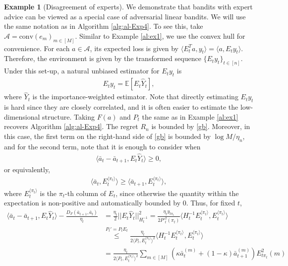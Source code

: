 \documentclass[letterpaper,11pt,openright,openany]{book}
\numberwithin{equation}{section}
\theoremstyle{plain}
\theoremstyle{definition}
\newtheorem{Ex}[Th]{Example}
\def\E{{\mathbb E}}
\begin{document}
\begin{Ex}[Disagreement of experts]\label{expert}
We demonstrate that bandits with expert advice can be viewed as a special case of adversarial linear bandits. We will use the same notation as in Algorithm \ref{alg:al-Exp4}. To see this, take $\mathcal A=\text{conv}(e_m)_{m\in [M]}$.  Similar to Example \ref{al:ex1}, we use the convex hull for convenience. For each $a\in\mathcal A$, its expected loss is given by $\langle E^T_ta, y_t\rangle=\langle a, E_ty_t\rangle$. Therefore, the environment is given by the transformed sequence $\{E_ty_t\}_{t\in [n]}$. Under this set-up, a natural unbiased estimator for $E_ty_t$ is 
\begin{align*}
E_ty_t = \E[E_t\hat{Y}_t],
\end{align*} 
where $\hat{Y}_t$ is the importance-weighted estimator. Note that directly estimating $E_ty_t$ is hard since they are closely correlated, and it is often easier to estimate the low-dimensional structure.  Taking $F(a)$ and $P_t$ the same as in Example \ref{al:ex1} recovers Algorithm \ref{alg:al-Exp4}. The regret $R_n$ is bounded by \eqref{gb}. Moreover, in this case, the first term on the right-hand side of \eqref{gb} is bounded by $\log M/\eta_n$, and for the second term, note that it is enough to consider when
\begin{align*} 
\langle\bar{a}_t-\bar{a}_{t+1}, E_t\hat{Y}_t\rangle\geq 0,
\end{align*}
or equivalently,
\begin{align*}
\langle\bar{a}_t, E_t^{\langle\pi_t\rangle}\rangle\geq \langle\bar{a}_{t+1}, E_t^{\langle\pi_t\rangle}\rangle,
\end{align*}
where $E_t^{\langle\pi_t\rangle}$ is the $\pi_t$-th column of $E_t$, since otherwise the quantity within the expectation is non-positive and automatically bounded by $0$. Thus, for fixed $t$, 
\begin{align*}
\langle \bar{a}_t- \bar{a}_{t+1}, E_t\hat{Y}_t\rangle-\frac{D_F(\bar{a}_{t+1}, \bar{a}_t)}{\eta_t}&=\frac{\eta_t}{2}||E_t\hat{Y}_t||^2_{H_t^{-1}}=\frac{\eta_ty_{t\pi_t}}{2{P'}^2_t(\pi_t)}\langle H_t^{-1}E_t^{\langle\pi_t\rangle}, E_t^{\langle\pi_t\rangle} \rangle\\
& \stackrel{P_t'= P_t E_t}{\leq} \frac{\eta_t}{2\langle P_t, E_t^{\langle\pi_t\rangle}\rangle^2}\langle H_t^{-1}E_t^{\langle\pi_t\rangle}, E_t^{\langle\pi_t\rangle} \rangle\\
& =\frac{\eta_t}{2\langle P_t, E_t^{\langle\pi_t\rangle}\rangle^2}\sum_{m\in [M]}\left(\kappa \bar{a}_t^{(m)}+(1-\kappa) \bar{a}_{t+1}^{(m)}\right)E^2_{t\pi_t}(m)\\

\end{align*}
\end{Ex}
\end{document}
